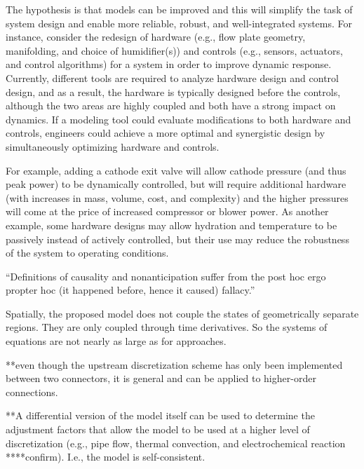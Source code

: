 The hypothesis is that  models can be improved and this will simplify the task of  system design and enable more reliable, robust, and well-integrated systems.
For instance, consider the redesign of hardware (e.g., flow plate geometry, manifolding, and choice of humidifier(s)) and controls (e.g., sensors, actuators, and control algorithms) for a  system in order to improve dynamic response.
Currently, different tools are required to analyze hardware design and control design, and as a result, the hardware is typically designed before the controls, although the two areas are highly coupled and both have a strong impact on dynamics.
If a modeling tool could evaluate modifications to both hardware and controls, engineers could achieve a more optimal and synergistic design by simultaneously optimizing hardware and controls.

For example, adding a cathode exit valve will allow cathode pressure (and thus peak  power) to be dynamically controlled, but will require additional hardware (with increases in mass, volume, cost, and complexity) and the higher pressures will come at the price of increased compressor or blower power.  As another example, some hardware designs may allow  hydration and temperature to be passively instead of actively controlled, but their use may reduce the robustness of the system to operating conditions.

``Definitions of causality and nonanticipation suffer from the post hoc ergo propter hoc (it happened before, hence it caused) fallacy.''~\cite{Willems - The Behavioral Approach to Open and Interconnected Systems}

Spatially, the proposed model does not couple the states of geometrically separate regions.  They are only coupled through time derivatives.  So the systems of equations are not nearly as large as for  approaches.

**even though the upstream discretization scheme has only been implemented between two connectors, it is general and can be applied to higher-order connections.

**A differential version of the model itself can be used to determine the adjustment factors that allow the model to be used at a higher level of discretization (e.g., pipe flow, thermal convection, and electrochemical reaction ****confirm).  I.e., the model is self-consistent.

